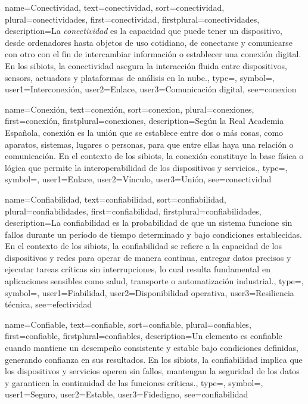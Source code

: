 	{
		name={Conectividad},
		text={conectividad},
		sort={conectividad},
		plural={conectividades},
		first={conectividad},
		firstplural={conectividades},
		description={La \emph{conectividad} es la capacidad que puede tener un dispositivo, desde ordenadores hasta objetos de uso cotidiano, de conectarse y comunicarse con otro con el fin de intercambiar informaci{\'o}n o establecer una conexi{\'o}n digital. En los \glspl{sibiot}, la conectividad asegura la interacci{\'o}n fluida entre \glspl{dispositivo}, \glspl{sensor}, \glspl{actuador} y \glspl{plataforma} de an{\'a}lisis en la \gls{nube}.},
		type=\glsdefaulttype,
		symbol={},
		user1={Interconexi{\'o}n},
		user2={Enlace},
		user3={Comunicaci{\'o}n digital},
		see={conexion}
	}
	
	{
		name={Conexi{\'o}n},
		text={conexi{\'o}n},
		sort={conexion},
		plural={conexiones},
		first={conexi{\'o}n},
		firstplural={conexiones},
		description={Seg{\'u}n la Real Academia Espa{\~n}ola, conexi{\'o}n es la uni{\'o}n que se establece entre dos o m{\'a}s cosas, como aparatos, sistemas, lugares o personas, para que entre ellas haya una relaci{\'o}n o comunicaci{\'o}n. En el contexto de los \glspl{sibiot}, la conexi{\'o}n constituye la base f{\'i}sica o l{\'o}gica que permite la interoperabilidad de los \glspl{dispositivo} y \glspl{servicio}.},
		type=\glsdefaulttype,
		symbol={},
		user1={Enlace},
		user2={V{\'i}nculo},
		user3={Uni{\'o}n},
		see={conectividad}
	}
	
	{
		name={Confiabilidad},
		text={confiabilidad},
		sort={confiabilidad},
		plural={confiabilidades},
		first={confiabilidad},
		firstplural={confiabilidades},
		description={La confiabilidad es la probabilidad de que un \gls{sistema} funcione sin fallos durante un periodo de tiempo determinado y bajo condiciones establecidas. En el contexto de los \glspl{sibiot}, la confiabilidad se refiere a la capacidad de los dispositivos y redes para operar de manera continua, entregar datos precisos y ejecutar tareas cr{\'i}ticas sin interrupciones, lo cual resulta fundamental en aplicaciones sensibles como salud, transporte o automatizaci{\'o}n industrial.},
		type=\glsdefaulttype,
		symbol={},
		user1={Fiabilidad},
		user2={Disponibilidad operativa},
		user3={Resiliencia t{\'e}cnica},
		see={efectividad}
	}
	
	{
		name={Confiable},
		text={confiable},
		sort={confiable},
		plural={confiables},
		first={confiable},
		firstplural={confiables},
		description={Un elemento es confiable cuando mantiene un desempe{\~n}o consistente y estable bajo condiciones definidas, generando confianza en sus resultados. En los \glspl{sibiot}, la confiabilidad implica que los \glspl{dispositivo} y servicios operen sin fallos, mantengan la seguridad de los datos y garanticen la continuidad de las funciones cr{\'i}ticas.},
		type=\glsdefaulttype,
		symbol={},
		user1={Seguro},
		user2={Estable},
		user3={Fidedigno},
		see={confiabilidad}
	}
	
